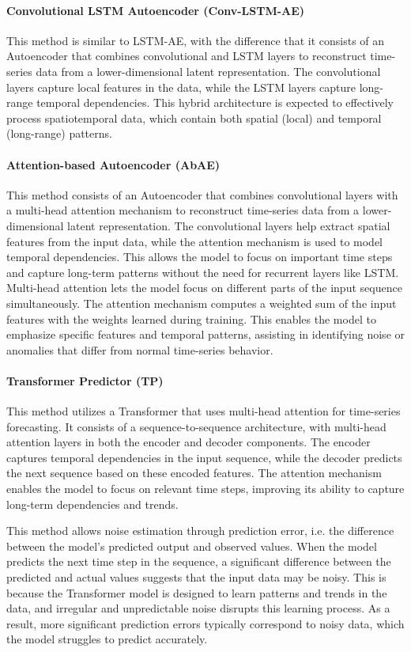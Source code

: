 \documentclass[conference]{IEEEtran}
\begin{document}
\paragraph{Convolutional LSTM Autoencoder (Conv-LSTM-AE)} This method is similar to LSTM-AE, with the difference that it consists of an Autoencoder that combines convolutional and LSTM layers to reconstruct time-series data from a lower-dimensional latent representation. The convolutional layers capture local features in the data, while the LSTM layers capture long-range temporal dependencies. This hybrid architecture is expected to effectively process spatiotemporal data, which contain both spatial (local) and temporal (long-range) patterns.
\paragraph{Attention-based Autoencoder (AbAE)} This method consists of an Autoencoder that combines convolutional layers with a multi-head attention mechanism to reconstruct time-series data from a lower-dimensional latent representation. The convolutional layers help extract spatial features from the input data, while the attention mechanism is used to model temporal dependencies. This allows the model to focus on important time steps and capture long-term patterns without the need for recurrent layers like LSTM. Multi-head attention lets the model focus on different parts of the input sequence simultaneously. The attention mechanism computes a weighted sum of the input features with the weights learned during training. This enables the model to emphasize specific features and temporal patterns, assisting in identifying noise or anomalies that differ from normal time-series behavior.
\paragraph{Transformer Predictor (TP)} This method utilizes a  Transformer that uses multi-head attention for time-series forecasting. It consists of a sequence-to-sequence architecture, with multi-head attention layers in both the encoder and decoder components. The encoder captures temporal dependencies in the input sequence, while the decoder predicts the next sequence based on these encoded features. The attention mechanism enables the model to focus on relevant time steps, improving its ability to capture long-term dependencies and trends.

This method allows noise estimation through prediction error, i.e. the
difference between the model's predicted output and observed
values. When the model predicts the next time step in the sequence, a
significant difference between the predicted and actual values
suggests that the input data may be noisy. This is because the
Transformer model is designed to learn patterns and trends in the
data, and irregular and unpredictable noise disrupts this learning
process. As a result, more significant prediction errors typically
correspond to noisy data, which the model struggles to predict
accurately.
\end{document}
